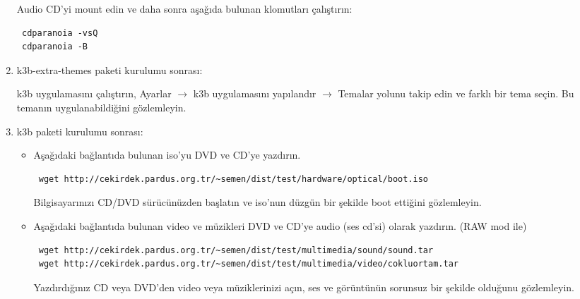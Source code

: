\documentclass[a4paper,10pt]{article}
\begin{document}
\begin{enumerate}
Audio CD'yi mount edin ve daha sonra aşağıda bulunan klomutları çalıştırın:
\begin{verbatim}
 cdparanoia -vsQ
 cdparanoia -B
\end{verbatim}
\item k3b-extra-themes paketi kurulumu sonrası:

k3b uygulamasını çalıştırın, Ayarlar $\rightarrow$ k3b uygulamasını yapılandır $\rightarrow$ Temalar yolunu takip edin ve farklı bir tema seçin. Bu temanın uygulanabildiğini gözlemleyin.

\item k3b paketi kurulumu sonrası:
\begin{itemize}
\item Aşağıdaki bağlantıda bulunan iso'yu DVD ve CD'ye yazdırın. 
\begin{verbatim}
 wget http://cekirdek.pardus.org.tr/~semen/dist/test/hardware/optical/boot.iso
\end{verbatim}

Bilgisayarınızı CD/DVD sürücünüzden başlatın ve iso'nun düzgün bir şekilde boot ettiğini gözlemleyin.

\item Aşağıdaki bağlantıda bulunan video ve müzikleri DVD ve CD'ye audio (ses cd'si) olarak yazdırın. (RAW mod ile)
\begin{verbatim}
 wget http://cekirdek.pardus.org.tr/~semen/dist/test/multimedia/sound/sound.tar
 wget http://cekirdek.pardus.org.tr/~semen/dist/test/multimedia/video/cokluortam.tar
\end{verbatim}
Yazdırdığınız CD veya DVD'den video veya müziklerinizi açın, ses ve görüntünün sorunsuz bir şekilde olduğunu gözlemleyin.

\end{itemize}

\end{enumerate}
\end{document}
